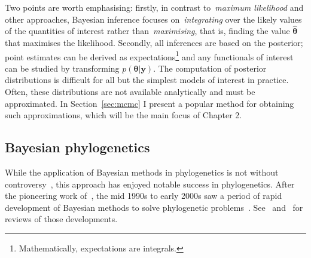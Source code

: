 Two points are worth emphasising: firstly, in contrast to~\textit{maximum likelihood} and other approaches, Bayesian inference focuses on~\textit{integrating} over the likely values of the quantities of interest rather than~\textit{maximising}, that is, finding the value $\hat{\boldsymbol\theta}$ that maximises the likelihood.
Secondly, all inferences are based on the posterior; point estimates can be derived as expectations\footnote{Mathematically, expectations are integrals.} and any functionals of interest can be studied by transforming $p(\boldsymbol\theta | \boldsymbol y)$. 
The computation of posterior distributions is difficult for all but the simplest models of interest in practice.
Often, these distributions are not available analytically and must be approximated.
In Section~\ref{sec:mcmc} I present a popular method for obtaining such approximations, which will be the main focus of Chapter 2.

\subsection{Bayesian phylogenetics}
\label{sec:bayesian_phylogenetics}

While the application of Bayesian methods in phylogenetics is not without controversy~\citep{Barker2015}, this approach has enjoyed notable success in phylogenetics.
After the pioneering work of~\cite{Kuhner1995}, the mid 1990s to early 2000s saw a period of rapid development of Bayesian methods to solve phylogenetic problems~\citep{Rannala1996,Mau1997,Yang1997,Kuhner1998,Larget1999,Li2000,Suchard2001,Drummond2002}.
See~\cite{Huelsenbeck2001b} and~\cite{Holder2003} for reviews of those developments.

